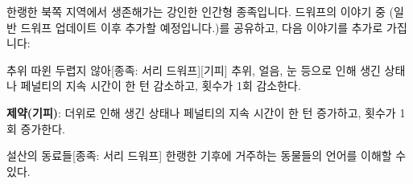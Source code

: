 \documentclass{report}
\begin{document}
	한랭한 북쪽 지역에서 생존해가는 강인한 인간형 종족입니다. 드워프의 이야기 중 (일반 드워프 업데이트 이후 추가할 예정입니다.)를 공유하고, 다음 이야기를 추가로 가집니다:
	
	\begin{story}{추위 따윈 두렵지 않아}{[종족: 서리 드워프][기피]}
		추위, 얼음, 눈 등으로 인해 생긴 상태나 페널티의 지속 시간이 한 턴 감소하고, 횟수가 1회 감소한다.
		
		\textbf{제약(기피)}: 더위로 인해 생긴 상태나 페널티의 지속 시간이 한 턴 증가하고, 횟수가 1회 증가한다.
		
	\end{story}
	
	\begin{story}{설산의 동료들}{[종족: 서리 드워프]}
		한랭한 기후에 거주하는 동물들의 언어를 이해할 수 있다.
		
	\end{story}
\end{document}

